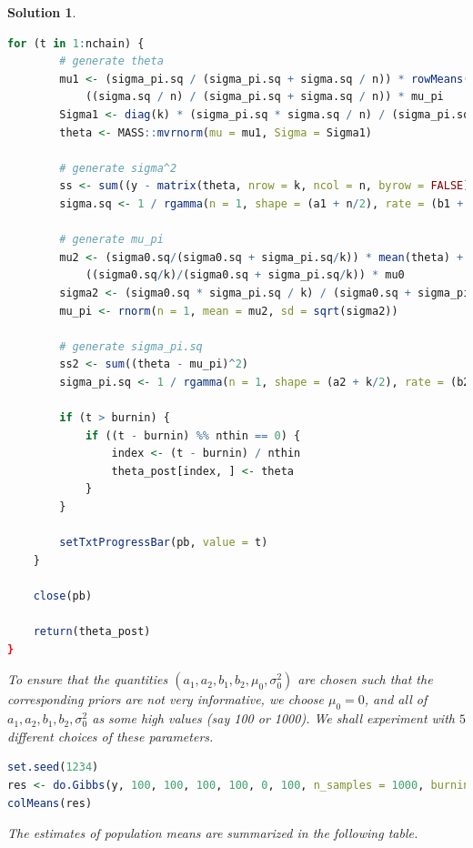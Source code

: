 \documentclass[12pt]{article}
\theoremstyle{problemstyle}
\newtheorem*{solution*}{Solution}
\begin{document}
\begin{solution*}
\begin{lstlisting}[language = R]
    for (t in 1:nchain) {
        # generate theta
        mu1 <- (sigma_pi.sq / (sigma_pi.sq + sigma.sq / n)) * rowMeans(y) + 
            ((sigma.sq / n) / (sigma_pi.sq + sigma.sq / n)) * mu_pi
        Sigma1 <- diag(k) * (sigma_pi.sq * sigma.sq / n) / (sigma_pi.sq + sigma.sq / n)
        theta <- MASS::mvrnorm(mu = mu1, Sigma = Sigma1)
        
        # generate sigma^2
        ss <- sum((y - matrix(theta, nrow = k, ncol = n, byrow = FALSE))^2)
        sigma.sq <- 1 / rgamma(n = 1, shape = (a1 + n/2), rate = (b1 + ss/2))
        
        # generate mu_pi
        mu2 <- (sigma0.sq/(sigma0.sq + sigma_pi.sq/k)) * mean(theta) + 
            ((sigma0.sq/k)/(sigma0.sq + sigma_pi.sq/k)) * mu0
        sigma2 <- (sigma0.sq * sigma_pi.sq / k) / (sigma0.sq + sigma_pi.sq / k)
        mu_pi <- rnorm(n = 1, mean = mu2, sd = sqrt(sigma2))
        
        # generate sigma_pi.sq
        ss2 <- sum((theta - mu_pi)^2)
        sigma_pi.sq <- 1 / rgamma(n = 1, shape = (a2 + k/2), rate = (b2 + ss2/2))
        
        if (t > burnin) {
            if ((t - burnin) %% nthin == 0) {
                index <- (t - burnin) / nthin
                theta_post[index, ] <- theta
            }
        }
        
        setTxtProgressBar(pb, value = t)
    }
    
    close(pb)
    
    return(theta_post)
}          
    \end{lstlisting}

    To ensure that the quantities $(a_1, a_2, b_1, b_2, \mu_0, \sigma_0^2)$ are chosen such that the corresponding priors are not very informative, we choose $\mu_0 = 0$, and all of $a_1, a_2, b_1, b_2, \sigma_0^2$ as some high values (say 100 or 1000). We shall experiment with $5$ different choices of these parameters.

\begin{lstlisting}[language = R]
set.seed(1234)
res <- do.Gibbs(y, 100, 100, 100, 100, 0, 100, n_samples = 1000, burnin = 1000, nthin = 10)
colMeans(res)
\end{lstlisting}

    The estimates of population means are summarized in the following table.


\end{solution*}
\end{document}
